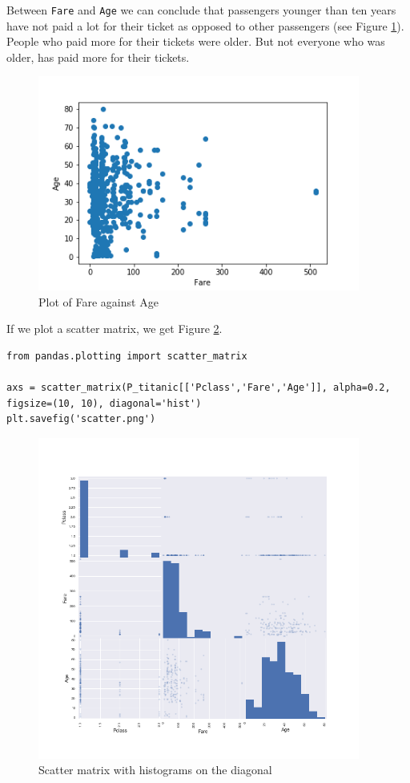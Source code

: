 \documentclass[11pt]{article}
\begin{document}
Between \texttt{Fare} and \texttt{Age} we can conclude that passengers younger than ten years have not paid a lot for their ticket as opposed to other passengers (see Figure \ref{tab:fareage}). People who paid more for their tickets were older. But not everyone who was older, has paid more for their tickets. 
\begin{figure}[htbp]
\centering
\includegraphics[width=400px]{./FareAge.png}
\caption{\label{tab:fareage}
Plot of Fare against Age}
\end{figure}


If we plot a scatter matrix, we get Figure \ref{tab:scattermatrix}.   
\newpage
\begin{verbatim}
from pandas.plotting import scatter_matrix

axs = scatter_matrix(P_titanic[['Pclass','Fare','Age']], alpha=0.2, figsize=(10, 10), diagonal='hist')
plt.savefig('scatter.png')
\end{verbatim}

\begin{figure}[htbp]
\centering
\includegraphics[width=400px]{./scatter.png}
\caption{\label{tab:scattermatrix}
Scatter matrix with histograms on the diagonal}
\end{figure}
\end{document}
